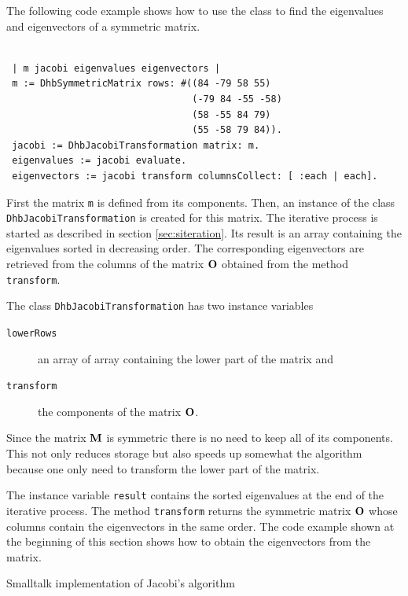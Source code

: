 \documentclass[twoside]{book}
\begin{document}
The following code example shows how to use the class to find the
eigenvalues and eigenvectors of a symmetric matrix.
\begin{codeExample}
\begin{verbatim}

 | m jacobi eigenvalues eigenvectors |
 m := DhbSymmetricMatrix rows: #((84 -79 58 55)
                                 (-79 84 -55 -58)
                                 (58 -55 84 79)
                                 (55 -58 79 84)).
 jacobi := DhbJacobiTransformation matrix: m.
 eigenvalues := jacobi evaluate.
 eigenvectors := jacobi transform columnsCollect: [ :each | each].
\end{verbatim}
\end{codeExample}
First the matrix {\tt m} is defined from its components. Then, an
instance of the class {\tt DhbJacobiTransformation} is created for
this matrix. The iterative process is started as described in
section \ref{sec:siteration}. Its result is an array containing
the eigenvalues sorted in decreasing order. The corresponding
eigenvectors are retrieved from the columns of the matrix ${\bf
O}$ obtained from the method {\tt transform}.

The class {\tt DhbJacobiTransformation} has two instance variables
\begin{description}
  \item[\tt lowerRows] an array of array containing the lower part
  of the matrix and
  \item[\tt transform] the components of the matrix ${\bf O}$.
\end{description}
Since the matrix ${\bf M}$ is symmetric there is no need to keep
all of its components. This not only reduces storage but also
speeds up somewhat the algorithm because one only need to
transform the lower part of the matrix.


The instance variable {\tt result} contains the sorted eigenvalues
at the end of the iterative process. The method {\tt transform}
returns the symmetric matrix ${\bf O}$ whose columns contain the
eigenvectors in the same order. The code example shown at the
beginning of this section shows how to obtain the eigenvectors
from the matrix.

\begin{listing} Smalltalk implementation of Jacobi's algorithm \label{ls:jacobi}

\end{listing}

\ifx\wholebook\relax\else
\end{document}
